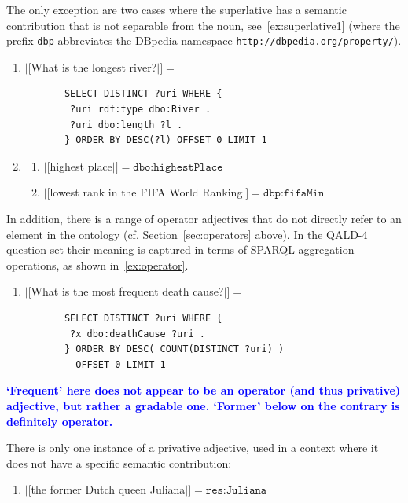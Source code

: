 \documentclass[11pt]{article}
\begin{document}
{The only exception are two cases where the superlative has a semantic contribution that is not separable from the noun, 
see~\ref{ex:superlative1} (where the prefix \texttt{dbp} abbreviates the DBpedia namespace \texttt{http://dbpedia.org/property/}).
\begin{enumerate}[resume]
\item $|[$What is the longest river?$|]=$
       \begin{verbatim}
       SELECT DISTINCT ?uri WHERE { 
        ?uri rdf:type dbo:River . 
        ?uri dbo:length ?l . 
       } ORDER BY DESC(?l) OFFSET 0 LIMIT 1 
       \end{verbatim}
\label{ex:superlative2}
\item \begin{enumerate}
\item $|[$highest place$|]=\texttt{dbo:highestPlace}$
\item $|[$lowest rank in the FIFA World Ranking$|]=\texttt{dbp:fifaMin}$
\end{enumerate}
\label{ex:superlative1}
\end{enumerate}

In addition, there is a range of operator adjectives that do not directly refer to an element in the ontology 
(cf. Section~\ref{sec:operators} above). In the QALD-4 question set their meaning is captured in terms 
of SPARQL aggregation operations, as shown in~\ref{ex:operator}. 
\begin{enumerate}[resume]
\item $|[$What is the most frequent death cause?$|]=$
       \begin{verbatim}
       SELECT DISTINCT ?uri WHERE {
        ?x dbo:deathCause ?uri . 
       } ORDER BY DESC( COUNT(DISTINCT ?uri) ) 
         OFFSET 0 LIMIT 1
       \end{verbatim}
       \label{ex:operator}
\end{enumerate}

\textbf{\textcolor{blue}{`Frequent' here does not appear to be an operator (and thus privative) adjective, but rather a gradable one. `Former' below on the contrary is definitely operator.}}

There is only one instance of a privative adjective, used in a context where it does not have a specific semantic contribution:
\begin{enumerate}[resume]
\item $|[$the former Dutch queen Juliana$|]=\texttt{res:Juliana}$
\end{enumerate}

}
\end{document}

